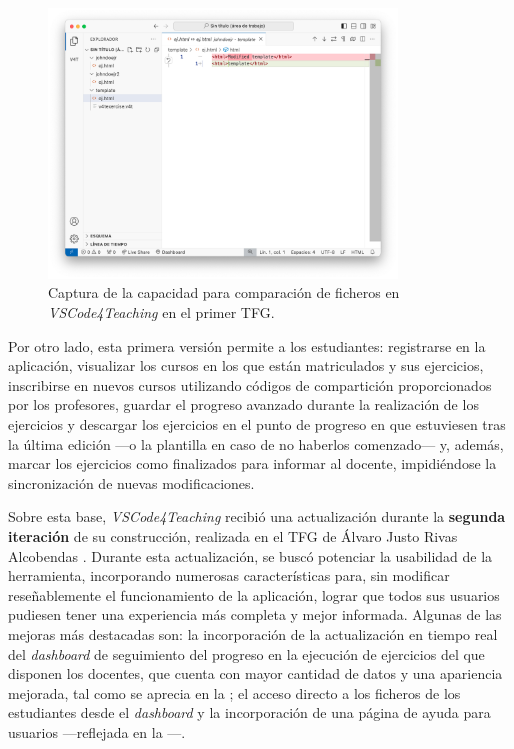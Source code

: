 \begin{figure}[h!]
    \centering
    \includegraphics[width=0.825\textwidth]{imagenes/utilizadas/1-introduccion/historia-tfg1-comparacionFicheros.png}
    \caption{Captura de la capacidad para comparación de ficheros en \textit{VSCode4Teaching} en el primer TFG.}
    \label{fig:historiaProyecto1Comparacion}
\end{figure}

Por otro lado, esta primera versión permite a los estudiantes: registrarse en la aplicación, visualizar los cursos en los que están matriculados y sus ejercicios, inscribirse en nuevos cursos utilizando códigos de compartición proporcionados por los profesores, guardar el progreso avanzado durante la realización de los ejercicios y descargar los ejercicios en el punto de progreso en que estuviesen tras la última edición ---o la plantilla en caso de no haberlos comenzado--- y, además, marcar los ejercicios como finalizados para informar al docente, impidiéndose la sincronización de nuevas modificaciones.

Sobre esta base, \textit{VSCode4Teaching} recibió una actualización durante la \textbf{segunda iteración} de su construcción, realizada en el TFG de Álvaro Justo Rivas Alcobendas \cite{TFG_Alvaro}. Durante esta actualización, se buscó potenciar la usabilidad de la herramienta, incorporando numerosas características para, sin modificar reseñablemente el funcionamiento de la aplicación, lograr que todos sus usuarios pudiesen tener una experiencia más completa y mejor informada. Algunas de las mejoras más destacadas son: la incorporación de la actualización en tiempo real del \textit{dashboard} de seguimiento del progreso en la ejecución de ejercicios del que disponen los docentes, que cuenta con mayor cantidad de datos y una apariencia mejorada, tal como se aprecia en la ; el acceso directo a los ficheros de los estudiantes desde el \textit{dashboard} y la incorporación de una página de ayuda para usuarios ---reflejada en la ---.

